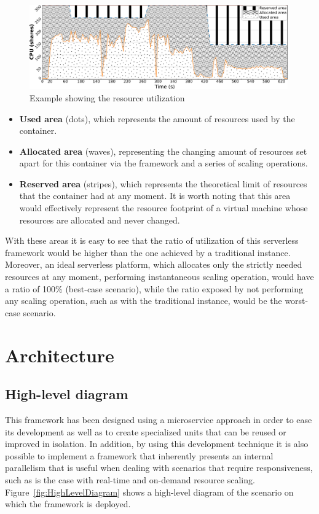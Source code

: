 \documentclass[12pt]{article}
\begin{document}
\begin{figure}[!tb]
	\centering
	\includegraphics[width=0.99\textwidth]{../img/use_case/integrals.png}
	\caption{Example showing the resource utilization}
	\label{fig:ResourceUtilization}
\end{figure}

\begin{itemize}
	\item \textbf{Used area} (dots), which represents the amount of resources used by the container.
	\item \textbf{Allocated area} (waves), representing the changing amount of resources set apart for this container via the framework and a series of scaling operations.
	\item \textbf{Reserved area} (stripes), which represents the theoretical limit of resources that the container had at any moment. It is worth noting that this area would effectively represent the resource footprint of a virtual machine whose resources are allocated and never changed.
\end{itemize}

With these areas it is easy to see that the ratio of utilization of this serverless framework would be higher than the one achieved by a traditional instance. Moreover, an ideal serverless platform, which allocates only the strictly needed resources at any moment, performing instantaneous scaling operation, would have a ratio of 100\% (best-case scenario), while the ratio exposed by not performing any scaling operation, such as with the traditional instance, would be the worst-case scenario.

\section{Architecture}

\subsection{High-level diagram}

This framework has been designed using a microservice approach in order to ease its development as well as to create specialized units that can be reused or improved in isolation. In addition, by using this development technique it is also possible to implement a framework that inherently presents an internal parallelism that is useful when dealing with scenarios that require responsiveness, such as is the case with real-time and on-demand resource scaling. Figure~\ref{fig:HighLevelDiagram} shows a high-level diagram of the scenario on which the framework is deployed.
\end{document}
